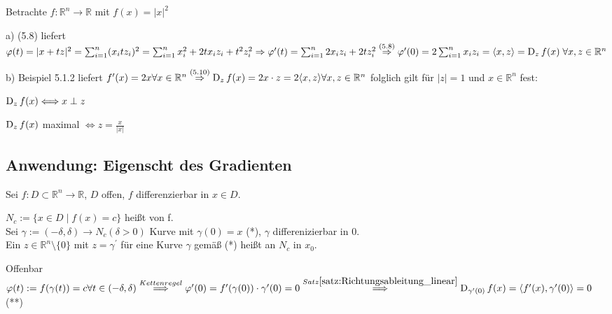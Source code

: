 \begin{beispiel}
    Betrachte $f: \mathbb{R}^n \to \mathbb{R}$ mit $f(x) = \vert x \vert^2$
    \begin{compactitem}
        \item[a)] (5.8) liefert $\varphi(t) = \vert x + tz\vert^2 = \sum_{i=1}^{n} (x_i t z_i)^2 = \sum_{i=1}^{n} x_i^2 + 2t x_i z_i + t^2 z_i^2 \Rightarrow \varphi^{\prime}(t) = \sum_{i=1}^{n} 2x_i z_i + 2t z_i^2 \overset{(5.8)}{\Rightarrow} \varphi^{\prime}(0) = 2 \sum_{i=1}^{n} x_i z_i = \langle x,z \rangle = \operatorname{D}_z  f(x)\; \forall x,z \in \mathbb{R}^n$
        \item[b)] Beispiel 5.1.2 liefert $f^{\prime}(x) = 2x \forall x \in \mathbb{R}^n \overset{(5.10)}{\Rightarrow} \operatorname{D}_z f(x) = 2x \cdot z = 2 \langle x,z \rangle \forall x,z \in \mathbb{R}^n$ folglich gilt für $\vert z \vert = 1$ und $x \in \mathbb{R}^n$ fest:
        \begin{compactitem}[\textbullet]
            \item $\operatorname{D}_z f(x) \Longleftrightarrow x \perp z$
            \item $\operatorname{D}_z f(x)$ maximal $\Longleftrightarrow z = \frac{x}{\vert x \vert}$
        \end{compactitem}
    \end{compactitem}
\end{beispiel}

\subsection{Anwendung: Eigenscht des Gradienten}

Sei $f: D \subset \mathbb{R}^n \to \mathbb{R}$, $D$ offen, $f$ differenzierbar in $x\in D$.\\

\begin{definition}
    $N_c := \{x \in D \mid f(x) = c\}$  heißt  von f.\\
    Sei $\gamma := (-\delta, \delta) \to N_c(\delta > 0)$ Kurve mit $\gamma(0) = x$ (*), $\gamma$ differenizierbar in $0$.\\
    Ein $z \in \mathbb{R}^n\setminus\{0\}$  mit $z = \gamma^{\prime}$ für eine Kurve $\gamma$ gemäß (*) heißt  an $N_c$ in $x_0$.
\end{definition}

Offenbar $\varphi(t) := f(\gamma(t)) = c \forall t \in (-\delta, \delta)\\ \overset{Kettenregel}{\Longrightarrow} \varphi^{\prime}(0) = f^{\prime}(\gamma(0))\cdot \gamma^{\prime}(0) = 0 \overset{Satz \ref{satz:Richtungsableitung_linear}}{\Longrightarrow} \operatorname{D}_{\gamma^{\prime}(0)}f(x) = \langle f^{\prime}(x),\gamma^{\prime}(0)\rangle =0$ (**)

